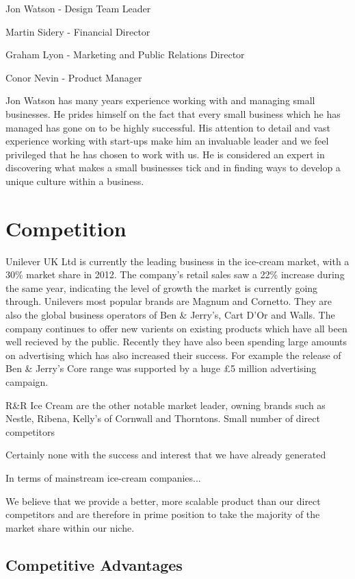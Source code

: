 \documentclass{article}
\begin{document}
  Jon Watson - Design Team Leader

  Martin Sidery - Financial Director

  Graham Lyon - Marketing and Public Relations Director

  Conor Nevin - Product Manager

Jon Watson has many years experience working with and managing small
businesses. He prides himself on the fact that every small business which he has managed has gone on to be highly successful. His attention to detail and vast experience working with start-ups make him an invaluable leader and we feel privileged that he has chosen to work with us. He is considered an expert in discovering what makes a small businesses tick and in finding ways to develop a unique culture within a business.


\section{Competition}

  Unilever UK Ltd is currently the leading business in the ice-cream market, with a 30\% market share in 2012. The company's retail sales saw a 22\% increase during the same year, indicating the level of growth the market is currently going through. Unilevers most popular brands are Magnum and Cornetto. They are also the global business operators of Ben \& Jerry's, Cart D'Or and Walls. The company continues to offer new varients on existing products which have all been well recieved by the public. Recently they have also been spending large amounts on advertising which has also increased their success. For example the release of Ben \& Jerry's Core range was supported by a huge £5 million advertising campaign.

  R\&R Ice Cream are the other notable market leader, owning brands such as Nestle, Ribena, Kelly's of Cornwall and Thorntons.  
  Small number of direct competitors

  Certainly none with the success and interest that we have already generated

  In terms of mainstream ice-cream companies...

  We believe that we provide a better, more scalable product than our direct competitors and are therefore in prime position to take the majority of the market share within our niche.


\subsection{Competitive Advantages}
\end{document}
